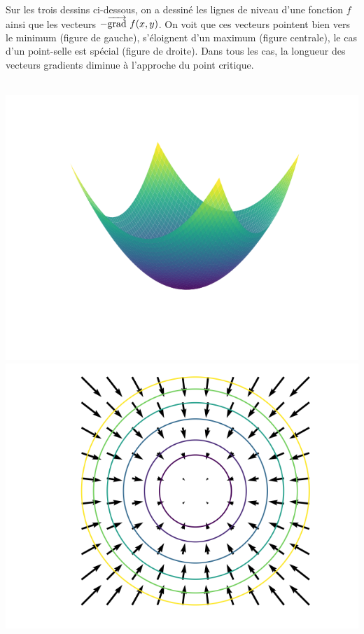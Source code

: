 Sur les trois dessins ci-dessous, on a dessiné les lignes de niveau d'une fonction $f$ ainsi que les vecteurs $-\overrightarrow{\textup{grad}}\  f(x,y)$. On voit que ces vecteurs pointent bien vers le minimum (figure de gauche), s'éloignent d'un maximum (figure centrale), le cas d'un point-selle est spécial (figure de droite). Dans tous les cas, la longueur des vecteurs gradients diminue à l'approche du point critique.


\begin{center}
	\begin{minipage}{0.30\textwidth}
		\center
		\ \ \includegraphics[scale=\myscale,scale=0.35]{figures/gradient-surface-1b}\\
		
		\includegraphics[scale=\myscale,scale=0.35]{figures/gradient-surface-5a}
		

\end{minipage}
\end{center}
